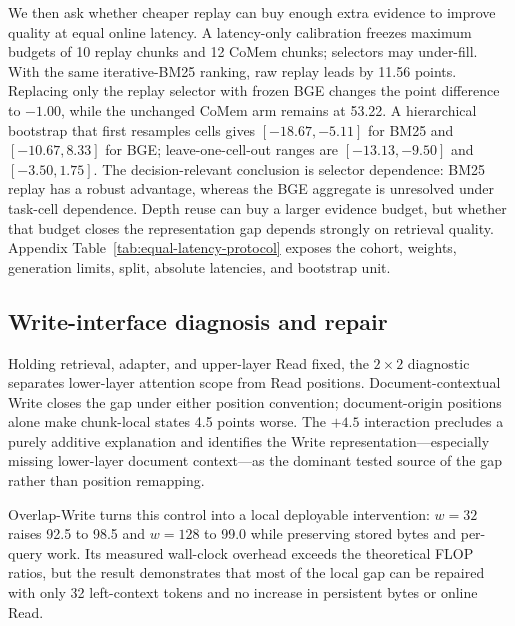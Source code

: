 

We then ask whether cheaper replay can buy enough extra evidence to improve
quality at equal online latency. A latency-only calibration freezes maximum
budgets of 10 replay chunks and 12 CoMem chunks; selectors may under-fill.
With the same iterative-BM25 ranking, raw replay
leads by 11.56 points. Replacing only the replay selector with frozen BGE changes
the point difference to $-1.00$, while the unchanged CoMem arm remains at
53.22. A hierarchical bootstrap that first resamples cells gives
$[-18.67,-5.11]$ for BM25 and $[-10.67,8.33]$ for BGE; leave-one-cell-out
ranges are $[-13.13,-9.50]$ and $[-3.50,1.75]$. The decision-relevant conclusion is selector dependence: BM25 replay has a
robust advantage, whereas the BGE aggregate is unresolved under task-cell
dependence. Depth reuse can buy a larger evidence budget, but whether that
budget closes the representation gap depends strongly on retrieval quality.
Appendix Table~\ref{tab:equal-latency-protocol} exposes the cohort, weights,
generation limits, split, absolute latencies, and bootstrap unit.

\subsection{Write-interface diagnosis and repair}



Holding retrieval, adapter, and upper-layer Read fixed, the $2{\times}2$
diagnostic separates lower-layer attention scope from Read positions.
Document-contextual Write closes the gap under either position convention;
document-origin positions alone make chunk-local states 4.5 points worse. The $+4.5$ interaction precludes a purely additive explanation and identifies
the Write representation---especially missing lower-layer document context---as
the dominant tested source of the gap rather than position remapping.

Overlap-Write turns this control into a local deployable intervention:
$w{=}32$ raises 92.5 to 98.5 and $w{=}128$ to 99.0 while preserving stored
bytes and per-query work. Its measured wall-clock overhead exceeds the theoretical FLOP ratios, but the
result demonstrates that most of the local gap can be repaired with only 32
left-context tokens and no increase in persistent bytes or online Read.

